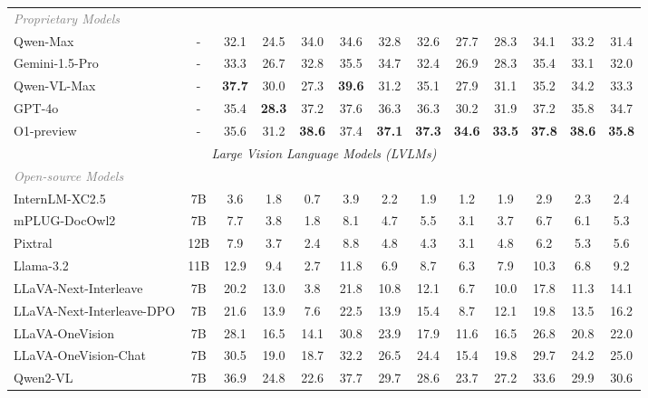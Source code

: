 \begin{table}[htbp]
{\begin{tabular}{lc|ccc|cccc|ccc|c}
        \textcolor{gray}{\textit{Proprietary Models}} \\
        Qwen-Max & - & 32.1 & 24.5 & 34.0 & 34.6 & 32.8 & 32.6 & 27.7 & 28.3 & 34.1 & 33.2 & 31.4 \\
        Gemini-1.5-Pro & - & 33.3 & 26.7 & 32.8 & 35.5 & 34.7 & 32.4 & 26.9 & 28.3 & 35.4 & 33.1 & 32.0 \\
        Qwen-VL-Max & - & \colorbox{firstBest}{\textbf{37.7}} & 30.0 & 27.3 & \colorbox{firstBest}{\textbf{39.6}} & 31.2 & 35.1 & 27.9 & 31.1 & 35.2 & 34.2 & 33.3 \\
        GPT-4o & - & 35.4 & \colorbox{firstBest}{\textbf{28.3}} & 37.2 & 37.6 & 36.3 & 36.3 & 30.2 & 31.9 & 37.2 & 35.8 & 34.7 \\
        O1-preview & - & 35.6 & 31.2 & \colorbox{firstBest}{\textbf{38.6}} & 37.4 & \colorbox{firstBest}{\textbf{37.1}} & \colorbox{firstBest}{\textbf{37.3}} & \colorbox{firstBest}{\textbf{34.6}} & \colorbox{firstBest}{\textbf{33.5}} & \colorbox{firstBest}{\textbf{37.8}} & \colorbox{firstBest}{\textbf{38.6}} & \colorbox{firstBest}{\textbf{35.8}} \\

        \midrule
        
        \multicolumn{13}{c}{\textit{Large Vision Language Models (LVLMs)} } \\
        
        \midrule
        
        \textcolor{gray}{\textit{Open-source Models}} \\
        InternLM-XC2.5 & 7B & 3.6 & 1.8 & 0.7 & 3.9 & 2.2 & 1.9 & 1.2 & 1.9 & 2.9 & 2.3 & 2.4 \\
        mPLUG-DocOwl2 & 7B & 7.7 & 3.8 & 1.8 & 8.1 & 4.7 & 5.5 & 3.1 & 3.7 & 6.7 & 6.1 & 5.3 \\
        Pixtral & 12B & 7.9 & 3.7 & 2.4 & 8.8 & 4.8 & 4.3 & 3.1 & 4.8 & 6.2 & 5.3 & 5.6 \\
        Llama-3.2 & 11B & 12.9 & 9.4 & 2.7 & 11.8 & 6.9 & 8.7 & 6.3 & 7.9 & 10.3 & 6.8 & 9.2 \\
        LLaVA-Next-Interleave & 7B & 20.2 & 13.0 & 3.8 & 21.8 & 10.8 & 12.1 & 6.7 & 10.0 & 17.8 & 11.3 & 14.1 \\
        LLaVA-Next-Interleave-DPO & 7B & 21.6 & 13.9 & 7.6 & 22.5 & 13.9 & 15.4 & 8.7 & 12.1 & 19.8 & 13.5 & 16.2 \\
        LLaVA-OneVision & 7B & 28.1 & 16.5 & 14.1 & 30.8 & 23.9 & 17.9 & 11.6 & 16.5 & 26.8 & 20.8 & 22.0 \\
        LLaVA-OneVision-Chat & 7B & 30.5 & 19.0 & 18.7 & 32.2 & 26.5 & 24.4 & 15.4 & 19.8 & 29.7 & 24.2 & 25.0 \\
        Qwen2-VL & 7B & 36.9 & 24.8 & 22.6 & 37.7 & 29.7 & 28.6 & 23.7 & 27.2 & 33.6 & 29.9 & 30.6 \\
        

\end{tabular}}
\end{table}

